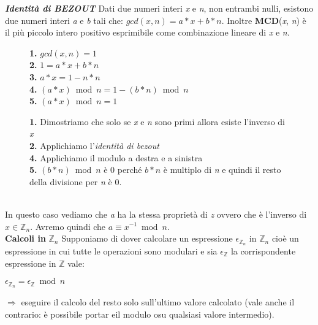 \textbf{\textit{Identità di BEZOUT}}
\newline
Dati due numeri interi \textit{x} e \textit{n}, non entrambi nulli, esistono due numeri interi \textit{a} e \textit{b} tali che: $gcd(x, n) = a * x + b * n$. Inoltre \textbf{MCD}(\textit{x}, \textit{n}) è il più piccolo intero positivo esprimibile come combinazione lineare di \textit{x} e \textit{n}.
\begin{figure}[h]
    \begin{minipage}[t]{0.45\textwidth}
        \textbf{1.} $gcd(x, n) = 1$ \\
        \textbf{2.} $1 = a * x + b * n$ \\
        \textbf{3.} $a * x = 1 - n * n$ \\
        \textbf{4.} $(a * x) \bmod n = 1 - (b * n) \bmod n$ \\
        \textbf{5.} $(a * x) \bmod n = 1$
    \end{minipage}
    \hfill
    \begin{minipage}[t]{0.45\textwidth}
        \textbf{1.} Dimostriamo che solo se \textit{x} e \textit{n} sono primi allora esiste l'inverso di \textit{x} \\
        \textbf{2.} Applichiamo l'\textit{identità di bezout} \\
        \textbf{4.} Applichiamo il modulo a destra e a sinistra \\
        \textbf{5.} $(b * n) \bmod n$ è 0 perché $b * n$ è multiplo di \textit{n} e quindi il resto della divisione per \textit{n} è 0.
    \end{minipage}
\end{figure}
\   \\
In questo caso vediamo che \textit{a} ha la stessa proprietà di \textit{z} ovvero che è l'inverso di $x \in \mathbb{Z}_n$. Avremo quindi che $a \equiv x^{-1} \bmod n$.
\\ \newline
\textbf{Calcoli in} $\mathbb{Z}_n$
\newline
Supponiamo di dover calcolare un espressione $\epsilon_{\mathbb{Z}_n}$ in $\mathbb{Z}_n$ cioè un espressione in cui tutte le operazioni sono modulari e sia $\epsilon_{\mathbb{Z}}$ la corrispondente espressione in $\mathbb{Z}$ vale:
\begin{center}
    $\epsilon_{\mathbb{Z}_n} = \epsilon_{\mathbb{Z}} \bmod n$
\end{center}
$\Rightarrow$ eseguire il calcolo del resto solo sull'ultimo valore calcolato (vale anche il contrario: è possibile portar eil modulo osu qualsiasi valore intermedio).
